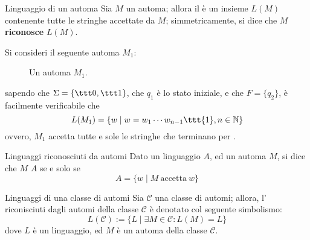 \documentclass[a4paper, 12pt]{report}
\begin{document}
    \begin{frameddefn}[label={def L(M)}]{Linguaggio di un automa}
        Sia $M$ un automa; allora il  è un insieme $L(M)$ contenente tutte le stringhe accettate da $M$; simmetricamente, si dice che $M$ \textbf{riconosce} $L(M)$.
    \end{frameddefn}

    \begin{example}
        Si consideri il seguente automa $M_1$:

        \begin{figure}[H]
            \centering
             \caption{Un automa $M_1$.}
        \end{figure}

        sapendo che $\Sigma = \{\ttt 0, \ttt 1\}$, che $q_1$ è lo stato iniziale, e che $F = \{q_2\}$, è facilmente verificabile che $$L(M_1) = \{w \mid w = w_1  \cdots w_{n - 1} \ttt{1}, n \in \mathbb{N}\}$$ ovvero, $M_1$ accetta tutte e sole le stringhe che terminano per .
    \end{example}

    \begin{frameddefn}{Linguaggi riconosciuti da automi}
        Dato un linguaggio $A$, ed un automa $M$, si dice che $M$  $A$ se e solo se $$A = \{w \mid M \ \mathrm{accetta} \ w\}$$
    \end{frameddefn}

    \begin{frameddefn}[label={ling automata}]{Linguaggi di una classe di automi}
        Sia $\mathcal{C}$ una classe di automi; allora, l' riconisciuti dagli automi della classe $\mathcal{C}$ è denotato col seguente simbolismo: $$L(\mathcal{C}) := \{L \mid \exists M \in \mathcal{C} : L(M) = L\}$$ dove $L$ è un linguaggio, ed $M$ è un automa della classe $\mathcal{C}$.
    \end{frameddefn}
\end{document}
